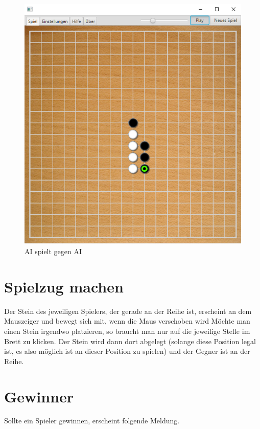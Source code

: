 \documentclass[11pt]{article}
\newcommand{\1}{{\mathds{1}}}
\newcommand{\imagewidth}{.8\linewidth}
\begin{document}
	\begin{figure}[H]
		\centering
		\includegraphics[width=\imagewidth]{ai.png}
		\caption{AI spielt gegen AI}
		\label{ai}
	\end{figure}
	
	\section{Spielzug machen}
	
	Der Stein des jeweiligen Spielers, der gerade an der Reihe ist, erscheint an dem Mauszeiger und bewegt sich mit, wenn die Maus verschoben wird
	Möchte man einen Stein irgendwo platzieren, so braucht man nur auf die jeweilige Stelle im Brett zu klicken.
	Der Stein wird dann dort abgelegt (solange diese Position legal ist, es also möglich ist an dieser Position zu spielen) und der Gegner ist an der Reihe. 

	\section{Gewinner}
	Sollte ein Spieler gewinnen, erscheint folgende Meldung. 
\end{document}
